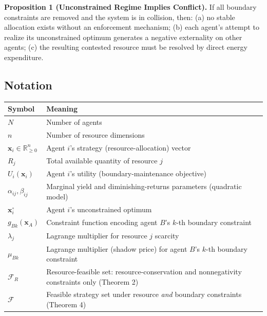 \documentclass[11pt]{article}
\newcounter{none}
\begin{document}
\textbf{Proposition 1 (Unconstrained Regime Implies Conflict).} If all
boundary constraints are removed and the system is in collision, then:
(a) no stable allocation exists without an enforcement mechanism; (b)
each agent's attempt to realize its unconstrained optimum generates a
negative externality on other agents; (c) the resulting contested
resource must be resolved by direct energy expenditure.

\subsection{Notation}\label{notation}

{\def\LTcaptype{none} %
\begin{longtable}[]{@{}
  >{\raggedright\arraybackslash}p{}
  >{\raggedright\arraybackslash}p{}@{}}
\toprule\noalign{}
\begin{minipage}[b]{\linewidth}\raggedright
Symbol
\end{minipage} & \begin{minipage}[b]{\linewidth}\raggedright
Meaning
\end{minipage} \\
\midrule\noalign{}
\endhead
\bottomrule\noalign{}
\endlastfoot
\(N\) & Number of agents \\
\(n\) & Number of resource dimensions \\
\(\mathbf{x}_i \in \mathbb{R}_{\geq 0}^n\) & Agent \(i\)'s strategy
(resource-allocation) vector \\
\(R_j\) & Total available quantity of resource \(j\) \\
\(U_i(\mathbf{x}_i)\) & Agent \(i\)'s utility (boundary-maintenance
objective) \\
\(\alpha_{ij}, \beta_{ij}\) & Marginal yield and diminishing-returns
parameters (quadratic model) \\
\(\mathbf{x}_i^{\circ}\) & Agent \(i\)'s unconstrained optimum \\
\(g_{Bk}(\mathbf{x}_A)\) & Constraint function encoding agent \(B\)'s
\(k\)-th boundary constraint \\
\(\lambda_j\) & Lagrange multiplier for resource \(j\) scarcity \\
\(\mu_{Bk}\) & Lagrange multiplier (shadow price) for agent \(B\)'s
\(k\)-th boundary constraint \\
\(\mathcal{F}_R\) & Resource-feasible set: resource-conservation and
nonnegativity constraints only (Theorem 2) \\
\(\mathcal{F}\) & Feasible strategy set under resource \emph{and}
boundary constraints (Theorem 4) \\
\end{longtable}
}
\end{document}
